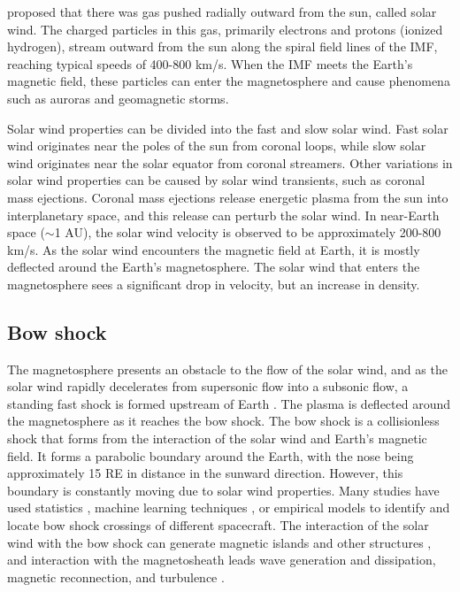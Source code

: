 \cite{Parker:1958} proposed that there was gas pushed radially outward from the sun, called solar wind. The charged particles in this gas, primarily electrons and protons (ionized hydrogen), stream outward from the sun along the spiral field lines of the IMF, reaching typical speeds of 400-800 km/s. When the IMF meets the Earth's magnetic field, these particles can enter the magnetosphere and cause phenomena such as auroras and geomagnetic storms.

Solar wind properties can be divided into the fast and slow solar wind. Fast solar wind originates near the poles of the sun from coronal loops, while slow solar wind originates near the solar equator from coronal streamers. Other variations in solar wind properties can be caused by solar wind transients, such as coronal mass ejections. Coronal mass ejections release energetic plasma from the sun into interplanetary space, and this release can perturb the solar wind. In near-Earth space ($\sim$1 \gls{AU}), the solar wind velocity is observed to be approximately 200-800 km/s. As the solar wind encounters the magnetic field at Earth, it is mostly deflected around the Earth's magnetosphere. The solar wind that enters the magnetosphere sees a significant drop in velocity, but an increase in density.

\subsection{Bow shock}
The magnetosphere presents an obstacle to the flow of the solar wind, and as the solar wind rapidly decelerates from supersonic flow into a subsonic flow, a standing fast shock is formed upstream of Earth \citep{Dimmock:2013}. The plasma is deflected around the magnetosphere as it reaches the bow shock. The bow shock is a collisionless shock that forms from the interaction of the solar wind and Earth's magnetic field. It forms a parabolic boundary around the Earth, with the nose being approximately 15 \gls{RE} in distance in the sunward direction. However, this boundary is constantly moving due to solar wind properties. Many studies have used statistics \citep{Kruparova:2019}, machine learning techniques \citep{Lalti:2022}, or empirical models \citep{chapman_three-dimensional_2003} to identify and locate bow shock crossings of different spacecraft. The interaction of the solar wind with the bow shock can generate magnetic islands and other structures \citep{Karimabadi:2014}, and interaction with the magnetosheath leads wave generation and dissipation, magnetic reconnection, and turbulence \citep{Shaikh:2022}. %


